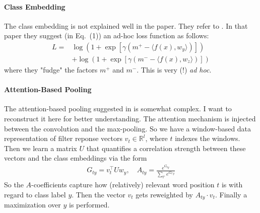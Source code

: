 \documentclass{article}
\renewcommand{\Re}{{\mathbb R}}
\begin{document}
\paragraph{Class Embedding} 

The class embedding is not explained well in the paper. They refer to \cite{santos2015classifying}. In that paper they suggest (in Eq.~(1))  an ad-hoc loss function as follows:
\begin{align}
L = & \log \left(1 + \exp \left[  \gamma \left( m^+ - \langle f(x), w_y \rangle \right)  \right]  \right)
\\ & \nonumber 
+ \log \left( 1+ \exp\left[  \gamma \left( m^- - \langle f(x), w_z \rangle \right) \right]  \right)
\end{align}
where they "fudge" the factors $m^+$ and $m^-$. This is very (!) \textit{ad hoc}. 
 
 \paragraph{Attention-Based Pooling}
 
The attention-based pooling suggested in \cite{wang2016relation} is somewhat complex. I want to reconstruct it here for better understanding. The attention mechanism is injected between the convolution and the max-pooling. So we have a window-based data representation of filter reponse vectors $v_t \in \Re^l$, where $t$ indexes the windows.  Then we learn a matrix $U$ that quantifies a correlation strength between these vectors and the class embeddings via the form 
\begin{align} 
G_{ty}= v_t^\top U w_y, \quad A_{ty} = \frac{ e^{G_{ty}}}{\sum_{t'} e^{G_{t'y}}}
\end{align}
So the $A$-coefficients capture how (relatively) relevant word position $t$ is with regard to class label $y$. Then the vector $v_t$ gets reweighted by $ A_{ty} \cdot v_t$. Finally a maximization over $y$ is performed. 
 
 


\end{document}
